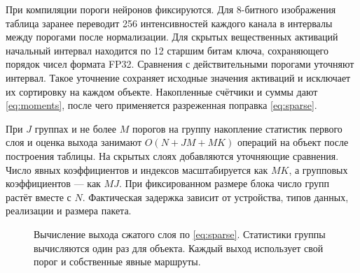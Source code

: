 \documentclass[11pt,a4paper]{article}
\begin{document}
При компиляции пороги нейронов фиксируются. Для 8-битного изображения таблица заранее переводит 256 интенсивностей каждого канала в интервалы между порогами после нормализации. Для скрытых вещественных активаций начальный интервал находится по 12 старшим битам ключа, сохраняющего порядок чисел формата FP32. Сравнения с действительными порогами уточняют интервал. Такое уточнение сохраняет исходные значения активаций и исключает их сортировку на каждом объекте. Накопленные счётчики и суммы дают \eqref{eq:moments}, после чего применяется разреженная поправка \eqref{eq:sparse}.

При $J$ группах и не более $M$ порогов на группу накопление статистик первого слоя и оценка выхода занимают $O(N+JM+MK)$ операций на объект после построения таблицы. На скрытых слоях добавляются уточняющие сравнения. Число явных коэффициентов и индексов масштабируется как $MK$, а групповых коэффициентов — как $MJ$. При фиксированном размере блока число групп растёт вместе с $N$. Фактическая задержка зависит от устройства, типов данных, реализации и размера пакета.

\begin{figure}[htbp]
\centering
{}
\caption{Вычисление выхода сжатого слоя по \eqref{eq:sparse}. Статистики группы вычисляются один раз для объекта. Каждый выход использует свой порог и собственные явные маршруты.}
\label{fig:algorithm}
\end{figure}
\end{document}
